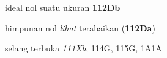 



































ideal nol suatu ukuran {\bf 112Db}




himpunan nol {\it lihat} terabaikan ({\bf 112Da})


\indexmedskip
























selang terbuka {\it 111Xb}, 114G, 115G, 1A1A




